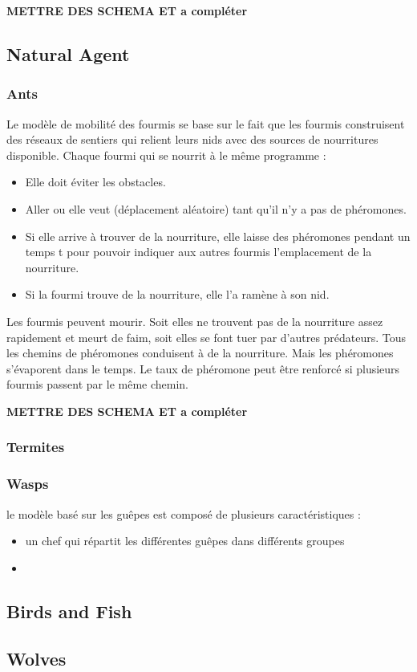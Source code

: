 \textbf{METTRE DES SCHEMA ET a compléter}

\subsection{Natural Agent}

\subsubsection{Ants}

Le modèle de mobilité des fourmis se base sur le fait que les fourmis construisent des réseaux de sentiers qui relient leurs   nids avec des sources de nourritures disponible.
Chaque fourmi qui se nourrit à le même programme :

\begin{itemize}
\item Elle doit éviter les obstacles.
\item Aller ou elle veut (déplacement aléatoire) tant qu'il n'y a pas de phéromones.
\item Si elle arrive à trouver de la nourriture, elle laisse des phéromones pendant un temps t pour pouvoir indiquer aux autres fourmis l'emplacement de la nourriture.
\item Si la fourmi trouve de la nourriture, elle l'a ramène à son nid.
\end{itemize}

Les fourmis peuvent mourir. Soit elles ne trouvent pas de la nourriture assez rapidement et meurt de faim, soit elles se font tuer par d'autres prédateurs.
Tous les chemins de phéromones conduisent à de la nourriture. Mais les phéromones s'évaporent dans le temps. Le taux de phéromone peut être renforcé si plusieurs fourmis passent par le même chemin.

\textbf{METTRE DES SCHEMA ET a compléter}

\subsubsection{Termites}

\subsubsection{Wasps}

le modèle basé sur les guêpes est composé de plusieurs caractéristiques :
\begin{itemize}
\item un chef qui répartit les différentes guêpes dans différents groupes
\item 
\end{itemize}

\subsection{Birds and Fish}

\subsection{Wolves}

